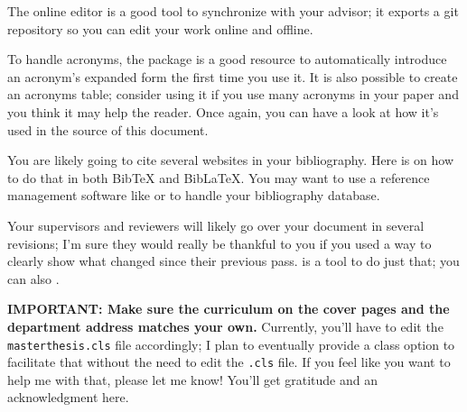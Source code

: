 The  online editor is a good tool to synchronize with
your advisor; it exports a git repository so you can edit your work online and offline.

To handle acronyms, the  package is a good resource to automatically introduce an acronym's expanded form the first time you use it. It is also possible to create an acronyms table; consider using it if you use many acronyms in your paper and you think it may help the reader. Once again, you can have a look at how it's used in the source of this document.

You are likely going to cite several websites in your bibliography. Here is  on how to do that in both BibTeX and BibLaTeX. You may want to use a reference management software like  or  to handle your bibliography database.

Your supervisors and reviewers will likely go over your document in several revisions; I'm sure they would really be thankful to you if you used a way to clearly show what changed since their previous pass.  is a tool to do just that; you can also .

\textbf{IMPORTANT: Make sure the curriculum on the cover pages and the department address matches your own.} Currently, you'll have to edit the \texttt{masterthesis.cls} file accordingly; I plan to eventually provide a class option to facilitate that without the need to edit the \texttt{.cls} file. If you feel like you want to help me with that, please let me know! You'll get gratitude and an acknowledgment here.

